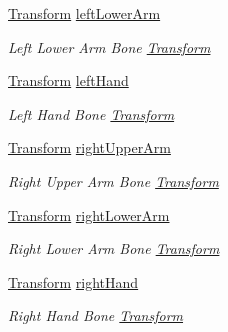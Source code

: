 \begin{DoxyCompactItemize}
\mbox{\hyperlink{class_lua_1_1_transform}{Transform}} \mbox{\hyperlink{class_lua_1_1_bones_ac1c0091627a3dda698685dd84d8b6e6a}{left\+Lower\+Arm}}
\begin{DoxyCompactList}\small\item\em Left Lower Arm Bone \mbox{\hyperlink{class_lua_1_1_transform}{Transform}} \end{DoxyCompactList}\item 
\mbox{\hyperlink{class_lua_1_1_transform}{Transform}} \mbox{\hyperlink{class_lua_1_1_bones_a3242c39368adafc9965e274f49d63283}{left\+Hand}}
\begin{DoxyCompactList}\small\item\em Left Hand Bone \mbox{\hyperlink{class_lua_1_1_transform}{Transform}} \end{DoxyCompactList}\item 
\mbox{\hyperlink{class_lua_1_1_transform}{Transform}} \mbox{\hyperlink{class_lua_1_1_bones_ae5b640e142fcbe64ab63218e48bc5271}{right\+Upper\+Arm}}
\begin{DoxyCompactList}\small\item\em Right Upper Arm Bone \mbox{\hyperlink{class_lua_1_1_transform}{Transform}} \end{DoxyCompactList}\item 
\mbox{\hyperlink{class_lua_1_1_transform}{Transform}} \mbox{\hyperlink{class_lua_1_1_bones_aa765e8509188018d417bfae9b678f4b7}{right\+Lower\+Arm}}
\begin{DoxyCompactList}\small\item\em Right Lower Arm Bone \mbox{\hyperlink{class_lua_1_1_transform}{Transform}} \end{DoxyCompactList}\item 
\mbox{\hyperlink{class_lua_1_1_transform}{Transform}} \mbox{\hyperlink{class_lua_1_1_bones_a33f155d4f1abdedd2c8f514fc9f768dd}{right\+Hand}}
\begin{DoxyCompactList}\small\item\em Right Hand Bone \mbox{\hyperlink{class_lua_1_1_transform}{Transform}} \end{DoxyCompactList}\item 

\end{DoxyCompactItemize}
